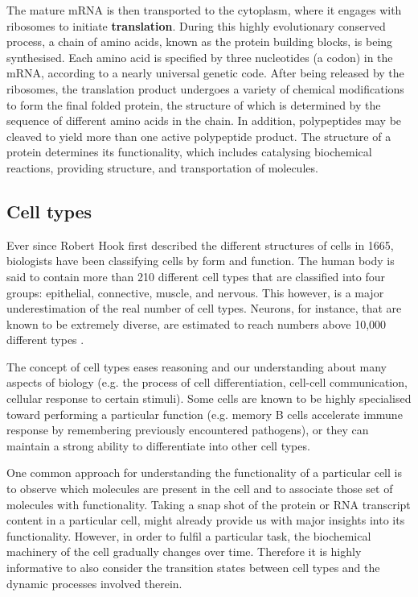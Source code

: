 The mature mRNA is then transported to the cytoplasm, where it engages with ribosomes to initiate \textbf{translation}. During this highly evolutionary conserved process, a chain of amino acids, known as the protein building blocks, is being synthesised. Each amino acid is specified by three nucleotides (a codon) in the mRNA, according to a nearly universal genetic code. After being released by the ribosomes, the translation product undergoes a variety of chemical modifications to form the final folded protein, the structure of which is determined by the sequence of different amino acids in the chain. In addition, polypeptides may be cleaved to yield more than one active polypeptide product. The structure of a protein determines its functionality, which includes catalysing biochemical reactions, providing structure, and transportation of molecules.


\subsection{Cell types}
Ever since Robert Hook first described the different structures of cells in 1665, biologists have been classifying cells by form and function.
The human body is said to contain more than 210 different cell types that are classified into four groups: epithelial, connective, muscle, and nervous. This however, is a major underestimation of the real number of cell types. Neurons, for instance, that are known to be extremely diverse, are estimated to reach numbers above 10,000 different types \cite{strachan_humanmoleculargenetics_2011}.

The concept of cell types eases reasoning and our understanding about many aspects of biology (e.g. the process of cell differentiation, cell-cell communication, cellular response to certain stimuli). Some cells are known to be highly specialised toward performing a particular function (e.g. memory B cells accelerate immune response by remembering previously encountered pathogens), or they can maintain a strong ability to differentiate into other cell types.

One common approach for understanding the functionality of a particular cell is to observe which molecules are present in the cell and to associate those set of molecules with functionality. Taking a snap shot of the protein or RNA transcript content in a particular cell, might already provide us with major insights into its functionality. However, in order to fulfil a particular task, the biochemical machinery of the cell gradually changes over time. Therefore it is highly informative to also consider the transition states between cell types and the dynamic processes involved therein.

